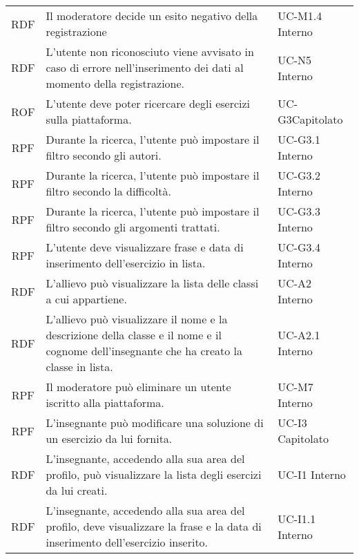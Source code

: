 \begin{tabularx}{\textwidth}{| c | p{10cm} | X |}
		RDF & Il moderatore decide un esito negativo della registrazione & UC-M1.4 \newline Interno\\
		RDF & L'utente non riconosciuto viene avvisato in caso di errore nell'inserimento dei dati al momento della registrazione. & UC-N5 \newline Interno\\
		ROF & L'utente deve poter ricercare degli esercizi sulla piattaforma. & UC-G3\newline Capitolato\\
		RPF & Durante la ricerca, l'utente può impostare il filtro secondo gli autori. & UC-G3.1 \newline Interno\\
		RPF & Durante la ricerca, l'utente può impostare il filtro secondo la difficoltà. & UC-G3.2 \newline Interno\\
		RPF & Durante la ricerca, l'utente può impostare il filtro secondo gli argomenti trattati. & UC-G3.3 \newline Interno\\
		RPF & L'utente deve visualizzare frase e data di inserimento dell'esercizio in lista. & UC-G3.4 \newline Interno\\
		RDF & L'allievo può visualizzare la lista delle classi a cui appartiene. & UC-A2 \newline Interno\\
		RDF & L'allievo può visualizzare il nome e la descrizione della classe e il nome e il cognome dell'insegnante che ha creato la classe in lista. & UC-A2.1 \newline Interno\\
		RPF & Il moderatore può eliminare un utente iscritto alla piattaforma. & UC-M7 \newline Interno\\
		RPF & L'insegnante può modificare una soluzione di un esercizio da lui fornita. & UC-I3 \newline Capitolato\\
		RDF & L'insegnante, accedendo alla sua area del profilo, può visualizzare la lista degli esercizi da lui creati. & UC-I1 \newline Interno\\
		RDF & L'insegnante, accedendo alla sua area del profilo, deve visualizzare la frase e la data di inserimento dell'esercizio inserito. & UC-I1.1 \newline Interno\\

\end{tabularx}
